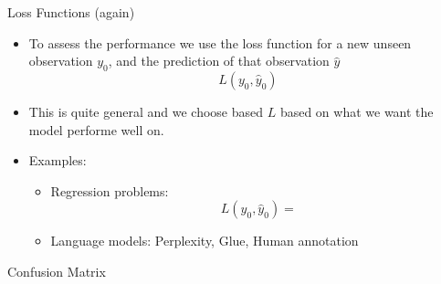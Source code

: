 \documentclass[10pt,handout]{beamer}
\begin{document}
\begin{frame}{Loss Functions (again)}



\begin{itemize}

\item To assess the performance we use the loss function for a new unseen observation $y_0$, and the prediction of that observation $\hat{y}$
\[
L(y_0,\hat{y}_0)
\]\pause
\item This is quite general and we choose based $L$ based on what we want the model performe well on.\pause
\item Examples:
\begin{itemize}
\item Regression problems:
\[
    L(y_0,\hat{y}_0) =
\]

\pause
\item Language models: Perplexity, Glue, Human annotation
\end{itemize}


\end{itemize}

\end{frame}


\begin{frame}{Confusion Matrix}



\end{frame}
\end{document}
